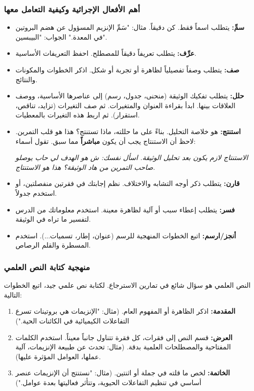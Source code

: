 \documentclass[12pt,a4paper]{book}
\newcommand{\quoteAr}[1]{%
	\begin{myquote}
		\itshape #1
	\end{myquote}
}
\begin{document}
	\subsubsection*{أهم الأفعال الإجرائية وكيفية التعامل معها}
	\begin{itemize}
		\item \textbf{سمِّ:} يتطلب اسماً فقط. كن دقيقاً. مثال: "سَمِّ الإنزيم المسؤول عن هضم البروتين في المعدة." الجواب: "البيبسين".
		\item \textbf{عرِّف:} يتطلب تعريفاً دقيقاً للمصطلح. احفظ التعريفات الأساسية.
		\item \textbf{صف:} يتطلب وصفاً تفصيلياً لظاهرة أو تجربة أو شكل. اذكر الخطوات والمكونات والنتائج.
		\item \textbf{حلل:} يتطلب تفكيك الوثيقة (منحنى، جدول، رسم) إلى عناصرها الأساسية، ووصف العلاقات بينها. ابدأ بقراءة العنوان والمتغيرات. ثم صف التغيرات (تزايد، تناقص، استقرار). ثم اربط هذه التغيرات بالمعطيات.
		\item \textbf{استنتج:} هو خلاصة التحليل. بناءً على ما حللته، ماذا تستنتج؟ هذا هو قلب التمرين. لاحظ أن الاستنتاج يجب أن يكون \textbf{مباشراً} مما سبق. تقول أسماء: \quoteAr{الاستنتاج لازم يكون بعد تحليل الوثيقة. اسأل نفسك: ش هو الهدف لي حاب يوصلو صاحب التمرين من هاد الوثيقة؟ هذا هو الاستنتاج.}
		\item \textbf{قارن:} يتطلب ذكر أوجه التشابه والاختلاف. نظم إجابتك في فقرتين منفصلتين، أو استخدم جدولاً.
		\item \textbf{فسر:} يتطلب إعطاء سبب أو آلية لظاهرة معينة. استخدم معلوماتك من الدرس لتفسير ما تراه في الوثيقة.
		\item \textbf{أنجز/ارسم:} اتبع الخطوات المنهجية للرسم (عنوان، إطار، تسميات...). استخدم المسطرة والقلم الرصاص.
	\end{itemize}
	
	\subsubsection*{منهجية كتابة النص العلمي}
	\label{sec:science-scientific-text-tips}

	
	النص العلمي هو سؤال شائع في تمارين الاسترجاع. لكتابة نص علمي جيد، اتبع الخطوات التالية:
	\begin{enumerate}
		\item \textbf{المقدمة:} اذكر الظاهرة أو المفهوم العام. (مثال: "الإنزيمات هي بروتينات تسرع التفاعلات الكيميائية في الكائنات الحية.")
		\item \textbf{العرض:} قسم النص إلى فقرات، كل فقرة تتناول جانباً معيناً. استخدم الكلمات المفتاحية والمصطلحات العلمية بدقة. (مثال: تحدث عن طبيعة الإنزيمات، آلية عملها، العوامل المؤثرة عليها).
		\item \textbf{الخاتمة:} لخص ما قلته في جملة أو اثنتين. (مثال: "نستنتج أن الإنزيمات عنصر أساسي في تنظيم التفاعلات الحيوية، وتتأثر فعاليتها بعدة عوامل.")
	\end{enumerate}
	
\end{document}
